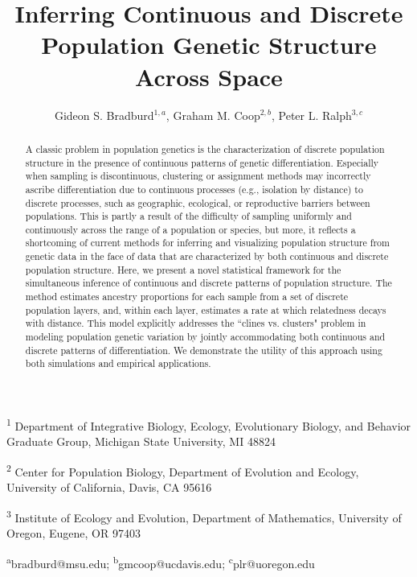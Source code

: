 \documentclass[12pt]{article}
\title{Inferring Continuous and Discrete Population Genetic Structure Across Space}
\date{\vspace{-5ex}}
\author{
Gideon S. Bradburd$^{1,a}$, 
Graham M. Coop$^{2,b}$,
Peter L. Ralph$^{3,c}$}
\begin{document}
\maketitle

\textsuperscript{1}
Department of Integrative Biology, 
Ecology, Evolutionary Biology, and Behavior Graduate Group,
Michigan State University, MI 48824

\textsuperscript{2}
Center for Population Biology,
Department of Evolution and Ecology, 
University of California, Davis, CA 95616

\textsuperscript{3}
Institute of Ecology and Evolution,
Department of Mathematics,
University of Oregon, Eugene, OR 97403

\textsuperscript{a}bradburd@msu.edu; 
\textsuperscript{b}gmcoop@ucdavis.edu;
\textsuperscript{c}plr@uoregon.edu\\\\\

\newpage
 
\begin{abstract}
A classic problem in population genetics is the characterization 
of discrete population structure in the presence of 
continuous patterns of genetic differentiation.
Especially when sampling is discontinuous, 
clustering or assignment methods may incorrectly ascribe differentiation 
due to continuous processes (e.g., isolation by distance) 
to discrete processes, such as geographic, ecological, or reproductive barriers 
between populations.
This is partly a result of the difficulty of sampling uniformly and continuously 
across the range of a population or species, 
but more, it reflects a shortcoming of current methods for inferring and 
visualizing population structure from genetic data in the face of data 
that are characterized by both continuous and discrete population structure.
Here, we present a novel statistical framework for the simultaneous inference 
of continuous and discrete patterns of population structure.
The method estimates ancestry proportions for each 
sample from a set of discrete population layers, 
and, within each layer, estimates a rate at which relatedness decays with distance.
This model explicitly addresses the ``clines vs. clusters" problem in 
modeling population genetic variation by jointly accommodating both 
continuous and discrete patterns of differentiation. 
We demonstrate the utility of this approach using both simulations and empirical applications.
\end{abstract}


\newpage
\end{document}

